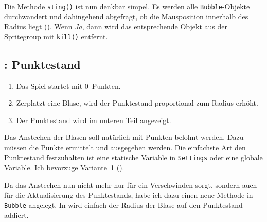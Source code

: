 
Die Methode \texttt{sting()} ist nun denkbar simpel. Es werden alle \texttt{Bubble}-Objekte durchwandert und dahingehend abgefragt, ob die Mausposition innerhalb des Radius liegt (). Wenn \emph{Ja}, dann wird das entsprechende Objekt aus der Spritegroup mit \texttt{kill()} entfernt.


\subsection{: Punktestand}
    \begin{enumerate}
        \item Das Spiel startet mit 0~Punkten.\label{reqPunktestandNull}
        \item Zerplatzt eine Blase, wird der Punktestand proportional zum Radius erhöht.\label{reqPunktestandRadius}
        \item Der Punktestand wird im unteren Teil angezeigt.\label{reqPunktestandAnzeige}
    \end{enumerate}
\er

Das Anstechen der Blasen soll natürlich mit Punkten belohnt werden. Dazu müssen die Punkte ermittelt und ausgegeben werden. Die einfachste Art den Punktestand festzuhalten ist eine statische Variable in \texttt{Settings} oder eine globale Variable. Ich bevorzuge Variante~1 (). 


Da das Anstechen nun nicht mehr nur für ein Verschwinden sorgt, sondern auch für die Aktualisierung des Punktestands, habe ich dazu einen neue Methode in \texttt{Bubble} angelegt. In  wird einfach der Radius der Blase auf den Punktestand addiert.

